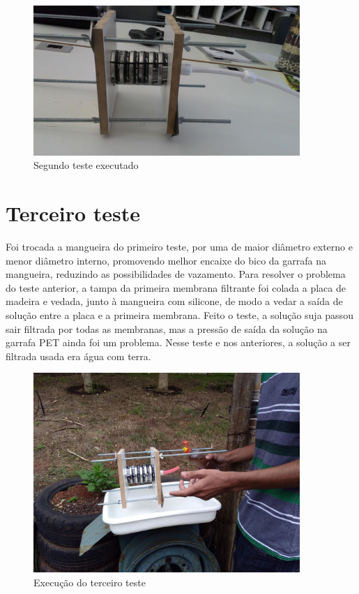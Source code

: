 \begin{figure}[H]
  \centering
  \includegraphics[width=0.9\textwidth]{figuras/segundo_teste.png}
  \caption{Segundo teste executado\label{fig:segundo_teste}}
\end{figure}


\section{Terceiro teste}\label{sec:terceiro_teste}

Foi trocada a mangueira do primeiro teste, por uma de maior diâmetro externo e
menor diâmetro interno, promovendo melhor encaixe do bico da garrafa na
mangueira, reduzindo as possibilidades de vazamento. Para resolver o problema do
teste anterior, a tampa da primeira membrana filtrante foi colada a placa de
madeira e vedada, junto à mangueira com silicone, de modo a vedar a saída de
solução entre a placa e a primeira membrana. Feito o teste, a solução suja
passou sair filtrada por todas as membranas, mas a pressão de saída da solução
na garrafa PET ainda foi um problema. Nesse teste e nos anteriores, a solução a
ser filtrada usada era água com terra.

\begin{figure}[H]
  \centering
  \includegraphics[width=0.9\textwidth]{figuras/terceiro_teste.png}
  \caption{Execução do terceiro teste\label{fig:terceiro_teste}}
\end{figure}


